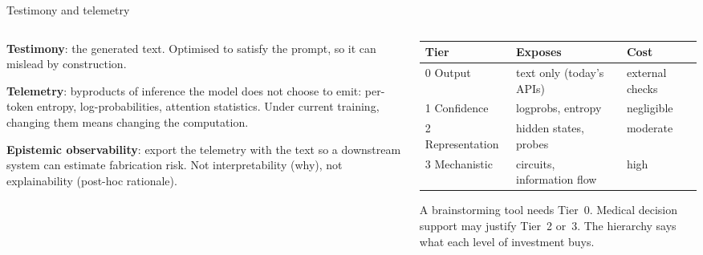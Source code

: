 \documentclass[aspectratio=169,10pt]{beamer}
\begin{document}
\begin{frame}{Testimony and telemetry}
  \begin{columns}[T]
    \begin{column}{0.46\textwidth}
      \textbf{Testimony}: the generated text. Optimised to satisfy the prompt,
      so it can mislead by construction.

      \vspace{0.5em}
      \textbf{Telemetry}: byproducts of inference the model does not choose to
      emit: per-token entropy, log-probabilities, attention statistics. Under
      current training, changing them means changing the computation.

      \vspace{0.5em}
      \textbf{Epistemic observability}: export the telemetry with the text so
      a downstream system can estimate fabrication risk. Not interpretability
      (why), not explainability (post-hoc rationale).
    \end{column}
    \begin{column}{0.54\textwidth}
      \footnotesize
      \begin{tabular}{@{}lll@{}}
        \toprule
        Tier & Exposes & Cost \\
        \midrule
        0 Output & text only (today's APIs) & external checks \\
        1 Confidence & logprobs, entropy & negligible \\
        2 Representation & hidden states, probes & moderate \\
        3 Mechanistic & circuits, information flow & high \\
        \bottomrule
      \end{tabular}
      \vspace{0.3em}

      \small A brainstorming tool needs Tier~0. Medical decision support may
      justify Tier~2 or~3. The hierarchy says what each level of investment buys.
    \end{column}
  \end{columns}
\end{frame}
\end{document}
